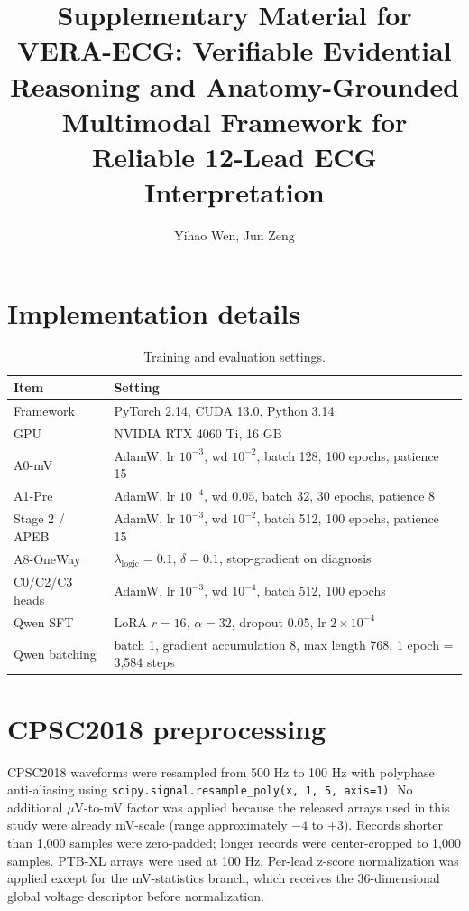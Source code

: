 \documentclass[11pt]{article}
\title{Supplementary Material for\\VERA-ECG: Verifiable Evidential Reasoning and Anatomy-Grounded Multimodal Framework for Reliable 12-Lead ECG Interpretation}
\author{Yihao Wen, Jun Zeng}
\date{}
\begin{document}
\maketitle

\section{Implementation details}
\begin{table}[h]
\centering
\caption{Training and evaluation settings.}
\begin{tabular}{ll}
\toprule
Item & Setting \\
\midrule
Framework & PyTorch 2.14, CUDA 13.0, Python 3.14 \\
GPU & NVIDIA RTX 4060 Ti, 16 GB \\
A0-mV & AdamW, lr $10^{-3}$, wd $10^{-2}$, batch 128, 100 epochs, patience 15 \\
A1-Pre & AdamW, lr $10^{-4}$, wd $0.05$, batch 32, 30 epochs, patience 8 \\
Stage 2 / APEB & AdamW, lr $10^{-3}$, wd $10^{-2}$, batch 512, 100 epochs, patience 15 \\
A8-OneWay & $\lambda_{\text{logic}}=0.1$, $\delta=0.1$, stop-gradient on diagnosis \\
C0/C2/C3 heads & AdamW, lr $10^{-3}$, wd $10^{-4}$, batch 512, 100 epochs \\
Qwen SFT & LoRA $r=16$, $\alpha=32$, dropout 0.05, lr $2\times10^{-4}$ \\
Qwen batching & batch 1, gradient accumulation 8, max length 768, 1 epoch = 3,584 steps \\
\bottomrule
\end{tabular}
\end{table}

\section{CPSC2018 preprocessing}
CPSC2018 waveforms were resampled from 500 Hz to 100 Hz with polyphase anti-aliasing using \texttt{scipy.signal.resample\_poly(x, 1, 5, axis=1)}. No additional $\mu$V-to-mV factor was applied because the released arrays used in this study were already mV-scale (range approximately $-4$ to $+3$). Records shorter than 1,000 samples were zero-padded; longer records were center-cropped to 1,000 samples. PTB-XL arrays were used at 100 Hz. Per-lead z-score normalization was applied except for the mV-statistics branch, which receives the 36-dimensional global voltage descriptor before normalization.
\end{document}
